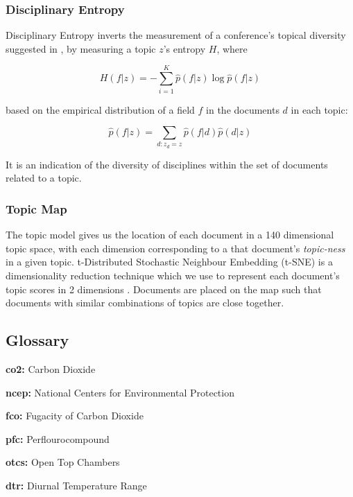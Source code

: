 \documentclass{article}
\begin{document}
\begin{linenumbers}
		
		\subsubsection*{Disciplinary Entropy}
		
		Disciplinary Entropy inverts the measurement of a conference's topical diversity suggested in \cite{Hall2008}, by measuring a topic \(z\)'s entropy \(H\), where 
		
		\begin{equation}
		H(f|z) = -\sum_{i=1}^K \hat{p}(f|z) \log \hat{p}(f|z) 
		\end{equation}
		
		based on the empirical distribution of a field \(f\) in the documents \(d\) in each topic:
		
		\begin{equation}
		\hat{p}(f|z) = \sum_{d:z_d=z} \hat{p} (f|d) \hat{p} (d|z)
		\end{equation}
		
		It is an indication of the diversity of disciplines within the set of documents related to a topic. 
		
		\subsubsection*{Topic Map}
		The topic model gives us the location of each document in a 140 dimensional topic space, with each dimension corresponding to a that document's \textit{topic-ness} in a given topic. t-Distributed Stochastic Neighbour Embedding (t-SNE) is a dimensionality reduction technique which we use to represent each document's topic scores in 2 dimensions \cite{vandermaaten2008}. Documents are placed on the map such that documents with similar combinations of topics are close together.
		
		
		\subsection*{Glossary}
		
		\noindent\textbf{co2:} Carbon Dioxide
		
		\noindent\textbf{ncep:} National Centers for Environmental Protection
		
		\noindent\textbf{fco:} Fugacity of Carbon Dioxide
		
		\noindent\textbf{pfc:} Perflourocompound
		
		\noindent\textbf{otcs:} Open Top Chambers
		
		\noindent\textbf{dtr:} Diurnal Temperature Range
		

\end{linenumbers}
\end{document}

